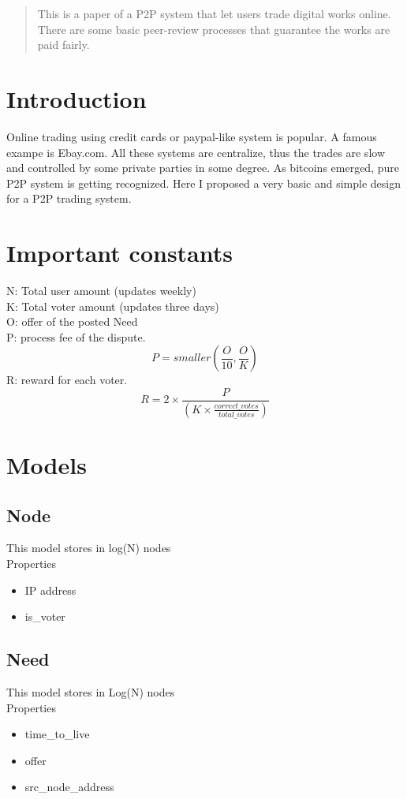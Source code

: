 \documentclass[12pt]{article}
\begin{document}
\maketitle

\begin{abstract}
This is a paper of a P2P system that let users trade digital works online. There are some basic peer-review processes that guarantee the works are paid fairly.
\end{abstract}

\section{Introduction}
Online trading using credit cards or paypal-like system is popular. A famous exampe is Ebay.com. All these systems are centralize, thus the trades are slow and controlled by some private parties in some degree. As bitcoins emerged, pure P2P system is getting recognized. Here I proposed a very basic and simple design for a P2P trading system. 

\section{Important constants}
N: Total user amount (updates weekly)\\
K: Total voter amount (updates three days)\\
O: offer of the posted Need\\
P: process fee of the dispute. 
\[
P = smaller(\frac{O}{10}, \frac{O}{K})
\]
R: reward for each voter. 
\[
R = 2 \times \frac{P}{(K \times \frac{correct\_votes}{total\_votes})}
\]

\section{Models}

\subsection{Node}
This model stores in log(N) nodes\\
Properties
\begin{itemize}
	\item IP address
	\item is\_voter
\end{itemize}

\subsection{Need}
This model stores in Log(N) nodes\\
Properties
\begin{itemize}
	\item time\_to\_live
	\item offer
	\item src\_node\_address
\end{itemize}
\end{document}
